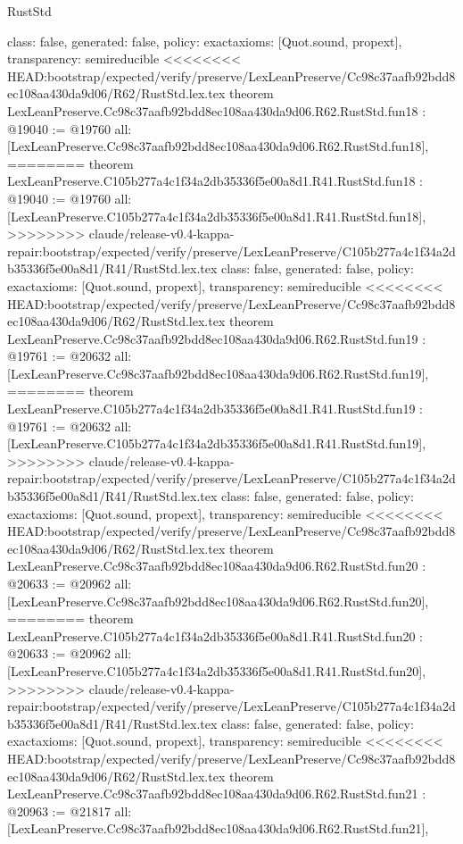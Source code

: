 \begin{lexlean}{RustStd}
\begin{coremodule}
{\begin{coremodule}
{{{{{{{{{{{{{{{{{{{{{  class: false,
  generated: false,
  policy: exact{axioms: [Quot.sound, propext]},
  transparency: semireducible
}
<<<<<<<< HEAD:bootstrap/expected/verify/preserve/LexLeanPreserve/Cc98c37aafb92bdd8ec108aa430da9d06/R62/RustStd.lex.tex
theorem LexLeanPreserve.Cc98c37aafb92bdd8ec108aa430da9d06.R62.RustStd.fun18 : @19040 := @19760 {
  all: [LexLeanPreserve.Cc98c37aafb92bdd8ec108aa430da9d06.R62.RustStd.fun18],
========
theorem LexLeanPreserve.C105b277a4c1f34a2db35336f5e00a8d1.R41.RustStd.fun18 : @19040 := @19760 {
  all: [LexLeanPreserve.C105b277a4c1f34a2db35336f5e00a8d1.R41.RustStd.fun18],
>>>>>>>> claude/release-v0.4-kappa-repair:bootstrap/expected/verify/preserve/LexLeanPreserve/C105b277a4c1f34a2db35336f5e00a8d1/R41/RustStd.lex.tex
  class: false,
  generated: false,
  policy: exact{axioms: [Quot.sound, propext]},
  transparency: semireducible
}
<<<<<<<< HEAD:bootstrap/expected/verify/preserve/LexLeanPreserve/Cc98c37aafb92bdd8ec108aa430da9d06/R62/RustStd.lex.tex
theorem LexLeanPreserve.Cc98c37aafb92bdd8ec108aa430da9d06.R62.RustStd.fun19 : @19761 := @20632 {
  all: [LexLeanPreserve.Cc98c37aafb92bdd8ec108aa430da9d06.R62.RustStd.fun19],
========
theorem LexLeanPreserve.C105b277a4c1f34a2db35336f5e00a8d1.R41.RustStd.fun19 : @19761 := @20632 {
  all: [LexLeanPreserve.C105b277a4c1f34a2db35336f5e00a8d1.R41.RustStd.fun19],
>>>>>>>> claude/release-v0.4-kappa-repair:bootstrap/expected/verify/preserve/LexLeanPreserve/C105b277a4c1f34a2db35336f5e00a8d1/R41/RustStd.lex.tex
  class: false,
  generated: false,
  policy: exact{axioms: [Quot.sound, propext]},
  transparency: semireducible
}
<<<<<<<< HEAD:bootstrap/expected/verify/preserve/LexLeanPreserve/Cc98c37aafb92bdd8ec108aa430da9d06/R62/RustStd.lex.tex
theorem LexLeanPreserve.Cc98c37aafb92bdd8ec108aa430da9d06.R62.RustStd.fun20 : @20633 := @20962 {
  all: [LexLeanPreserve.Cc98c37aafb92bdd8ec108aa430da9d06.R62.RustStd.fun20],
========
theorem LexLeanPreserve.C105b277a4c1f34a2db35336f5e00a8d1.R41.RustStd.fun20 : @20633 := @20962 {
  all: [LexLeanPreserve.C105b277a4c1f34a2db35336f5e00a8d1.R41.RustStd.fun20],
>>>>>>>> claude/release-v0.4-kappa-repair:bootstrap/expected/verify/preserve/LexLeanPreserve/C105b277a4c1f34a2db35336f5e00a8d1/R41/RustStd.lex.tex
  class: false,
  generated: false,
  policy: exact{axioms: [Quot.sound, propext]},
  transparency: semireducible
}
<<<<<<<< HEAD:bootstrap/expected/verify/preserve/LexLeanPreserve/Cc98c37aafb92bdd8ec108aa430da9d06/R62/RustStd.lex.tex
theorem LexLeanPreserve.Cc98c37aafb92bdd8ec108aa430da9d06.R62.RustStd.fun21 : @20963 := @21817 {
  all: [LexLeanPreserve.Cc98c37aafb92bdd8ec108aa430da9d06.R62.RustStd.fun21],
}}}}}}}}}}}}}}}}}}}}}}}}
\end{coremodule}}
\end{coremodule}
\end{lexlean}
